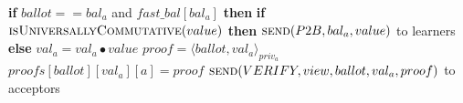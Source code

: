 \begin{algorithm}
\begin{algorithmic}[1]
		\State
		\State \textbf{if} $ballot == bal_a$ and $fast\_bal[bal_a]$ \textbf{then}
		\State \hspace{\algorithmicindent} \textbf{if} $\Call{isUniversallyCommutative}{value}$ \textbf{then}
		\State \hspace{\algorithmicindent}\hspace{\algorithmicindent} $\Call{send}{P2B,bal_a, value}$ to learners
		\State \hspace{\algorithmicindent} \textbf{else}
		\State \hspace{\algorithmicindent}\hspace{\algorithmicindent} $val_a = val_a \bullet value$
		\State \hspace{\algorithmicindent}\hspace{\algorithmicindent} $proof = \langle ballot, val_a \rangle_{priv_a}$
		\State \hspace{\algorithmicindent}\hspace{\algorithmicindent} $proofs[ballot][val_a][a] = proof$
		\State \hspace{\algorithmicindent}\hspace{\algorithmicindent} $\Call{send}{VERIFY, view, ballot, val_a, proof}$ to acceptors
		\EndFunction
	\end{algorithmic}
\end{algorithm}

